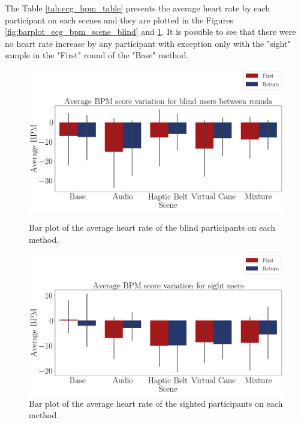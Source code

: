 The Table \ref{tab:ecg_bpm_table} presents the average heart rate by each participant on each scenes and they are plotted in the Figures \ref{fig:barplot_ecg_bpm_scene_blind} and \ref{fig:barplot_ecg_bpm_scene_sight}. It is possible to see that there were no heart rate increase by any participant with exception only with the "sight" sample in the "First" round of the "Base" method.



\begin{figure}[!htb]
    \centering
    \begin{minipage}{\textwidth}
        \centering
        \includegraphics[width = 0.8\linewidth]{Resultados/ECG/Figuras/png/barplot_ecg_bpm_scene_blind.png}
        \caption{Bar plot of the average heart rate of the blind participants on each method.}
        \label{fig:barplot_ecg_bpm_scene_blind}
    \end{minipage}
    \begin{minipage}{\textwidth}
        \centering
        \includegraphics[width = 0.8\linewidth]{Resultados/ECG/Figuras/png/barplot_ecg_bpm_scene_sight.png}
        \caption{Bar plot of the average heart rate of the sighted participants on each method.}
        \label{fig:barplot_ecg_bpm_scene_sight}
    \end{minipage}
\end{figure}


